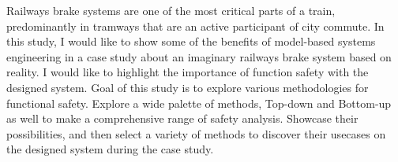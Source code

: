 Railways brake systems are one of the most critical parts of a train, predominantly in tramways that are an active participant of city commute.
In this study, I would like to show some of the benefits of model-based systems engineering in a case study about an imaginary railways brake system based on reality.
I would like to highlight the importance of function safety with the designed system.
Goal of this study is to explore various methodologies for functional safety.
Explore a wide palette of methods, Top-down and Bottom-up as well to make a comprehensive range of safety analysis.
Showcase their possibilities, and then select a variety of methods to discover their usecases on the designed system during the case study.


\vfill
\cleardoublepage

\selectthesislanguage

\setcounter{romanPage}{\value{page}}

